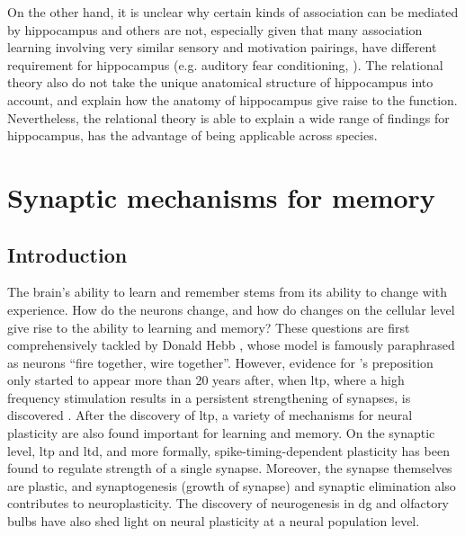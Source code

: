 On the other hand, it is unclear why certain kinds of association can be mediated by hippocampus and others are not, especially given that many association learning involving very similar sensory and motivation pairings, have different requirement for hippocampus (e.g. auditory fear conditioning, \citep{phillips92}). The relational theory also do not take the unique anatomical structure of hippocampus into account, and explain how the anatomy of hippocampus give raise to the function. Nevertheless, the relational theory is able to explain a wide range of findings for hippocampus, has the advantage of being applicable across species.

\begin{comment}
\subsubsection{Conclusion}
\citep{opitz14} hpc and memory
\citep{shohamy13} hpc in cognition
\citep{huijgen15} hpc node of memory

\citep{lee16} lesion studies review
\citep{mcdonald13} memory to behaviour
\citep{middei14} hpc in learning disorder
\citep{eichenbaum14} hpc where vs episodic
\citep{sasaki15} hpc memory circuit
\end{comment}

\section{Synaptic mechanisms for memory}
\subsection{Introduction}
The brain's ability to learn and remember stems from its ability to change with experience. How do the neurons change, and how do changes on the cellular level give rise to the ability to learning and memory? These questions are first comprehensively tackled by Donald Hebb \citeyear{hebb49}, whose model is famously paraphrased as neurons ``fire together, wire together''. However, evidence for \citet{hebb49}'s preposition only started to appear more than 20 years after, when \gls{ltp}, where a high frequency stimulation results in a persistent strengthening of synapses, is discovered \citep{bliss73}. After the discovery of \gls{ltp}, a variety of mechanisms for neural plasticity are also found important for learning and memory. On the synaptic level, \gls{ltp} and \gls{ltd}, and more formally, spike-timing-dependent plasticity has been found to regulate strength of a single synapse. Moreover, the synapse themselves are plastic, and synaptogenesis (growth of synapse) and synaptic elimination also contributes to neuroplasticity. The discovery of neurogenesis in \gls{dg} and olfactory bulbs have also shed light on neural plasticity at a neural population level.

